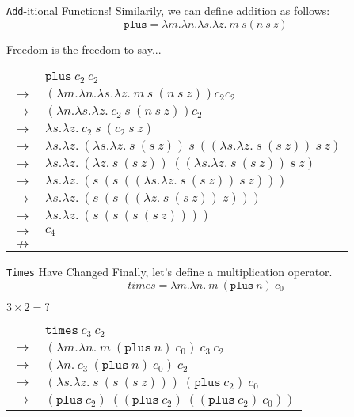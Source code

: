 \documentclass[11pt]{beamer}
\begin{document}
\begin{frame}[fragile=singleslide]{\texttt{Add}-itional Functions!}
Similarily, we can define addition as follows:
\begin{equation}
\texttt{plus} = \lambda m. \lambda n. \lambda s. \lambda z.\:m\:s(n\:s\:z)
\end{equation}

\begin{center}
\underline{Freedom is the freedom to say...} \\
\begin{tabular}{c l}
& $\texttt{plus}\:c_2\:c_2$ \\ 
$\rightarrow$ & $(\lambda m. \lambda n. \lambda s. \lambda z.\:m\:s\:(n\:s\:z)) c_2 c_2$ \\
$\rightarrow$ & $(\lambda n. \lambda s. \lambda z.\:c_2\:s\:(n\:s\:z)) c_2$ \\
$\rightarrow$ & $\lambda s. \lambda z.\:c_2\:s\:(c_2\:s\:z)$ \\
$\rightarrow$ & $\lambda s. \lambda z.\:(\lambda s. \lambda z.\:s\:(s\:z))\:s\:((\lambda s. \lambda z.\:s\:(s\:z))\:s\:z)$ \\
$\rightarrow$ & $\lambda s. \lambda z.\:(\lambda z.\:s\:(s\:z))\:((\lambda s. \lambda z.\:s\:(s\:z))\:s\:z)$ \\
$\rightarrow$ & $\lambda s. \lambda z.\:(s\:(s\:((\lambda s. \lambda z.\:s\:(s\:z))\:s\:z)))$ \\
$\rightarrow$ & $\lambda s. \lambda z.\:(s\:(s\:((\lambda z.\:s\:(s\:z))\:z)))$ \\
$\rightarrow$ & $\lambda s. \lambda z.\:(s\:(s\:(s\:(s\:z))))$ \\
$\rightarrow$ & $c_4$ \\
$\nrightarrow$ & \\
\end{tabular}
\end{center}
\end{frame}

\begin{frame}[fragile=singleslide]{\texttt{Times} Have Changed}
Finally, let's define a multiplication operator.  
\begin{equation}
times = \lambda m. \lambda n.\:m\:(\texttt{plus}\:n)\:c_0 
\end{equation}

\begin{center}
\underline{$3 \times 2 = ?$} \\
\begin{tabular}{c l}
& $\texttt{times}\:c_3\:c_2$ \\ 
$\rightarrow$ & $(\lambda m. \lambda n.\:m\:(\texttt{plus}\:n)\:c_0)\:c_3\:c_2$ \\
$\rightarrow$ & $(\lambda n.\:c_3\:(\texttt{plus}\:n)\:c_0)\:c_2$ \\
$\rightarrow$ & $(\lambda s. \lambda z.\:s\:(s\:(s\:z)))\:(\texttt{plus}\:c_2)\:c_0$ \\
$\rightarrow$ & $(\texttt{plus}\:c_2)\:((\texttt{plus}\:c_2)\:((\texttt{plus}\:c_2)\:c_0))$ \\
\end{tabular}
\end{center}
\end{frame}
\end{document}
